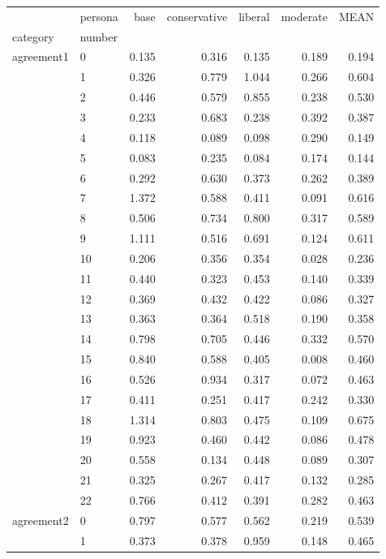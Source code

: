\begin{table}
\label{tab:questionnaire:sosec.var}
\begin{tabular}{llrrrrr}
\toprule
 & persona & base & conservative & liberal & moderate & MEAN \\
category & number &  &  &  &  &  \\
\midrule
\multirow[t]{23}{*}{agreement1} & 0 & 0.135 & 0.316 & 0.135 & 0.189 & 0.194 \\
 & 1 & 0.326 & 0.779 & 1.044 & 0.266 & 0.604 \\
 & 2 & 0.446 & 0.579 & 0.855 & 0.238 & 0.530 \\
 & 3 & 0.233 & 0.683 & 0.238 & 0.392 & 0.387 \\
 & 4 & 0.118 & 0.089 & 0.098 & 0.290 & 0.149 \\
 & 5 & 0.083 & 0.235 & 0.084 & 0.174 & 0.144 \\
 & 6 & 0.292 & 0.630 & 0.373 & 0.262 & 0.389 \\
 & 7 & 1.372 & 0.588 & 0.411 & 0.091 & 0.616 \\
 & 8 & 0.506 & 0.734 & 0.800 & 0.317 & 0.589 \\
 & 9 & 1.111 & 0.516 & 0.691 & 0.124 & 0.611 \\
 & 10 & 0.206 & 0.356 & 0.354 & 0.028 & 0.236 \\
 & 11 & 0.440 & 0.323 & 0.453 & 0.140 & 0.339 \\
 & 12 & 0.369 & 0.432 & 0.422 & 0.086 & 0.327 \\
 & 13 & 0.363 & 0.364 & 0.518 & 0.190 & 0.358 \\
 & 14 & 0.798 & 0.705 & 0.446 & 0.332 & 0.570 \\
 & 15 & 0.840 & 0.588 & 0.405 & 0.008 & 0.460 \\
 & 16 & 0.526 & 0.934 & 0.317 & 0.072 & 0.463 \\
 & 17 & 0.411 & 0.251 & 0.417 & 0.242 & 0.330 \\
 & 18 & 1.314 & 0.803 & 0.475 & 0.109 & 0.675 \\
 & 19 & 0.923 & 0.460 & 0.442 & 0.086 & 0.478 \\
 & 20 & 0.558 & 0.134 & 0.448 & 0.089 & 0.307 \\
 & 21 & 0.325 & 0.267 & 0.417 & 0.132 & 0.285 \\
 & 22 & 0.766 & 0.412 & 0.391 & 0.282 & 0.463 \\
\cline{1-7}
\multirow[t]{36}{*}{agreement2} & 0 & 0.797 & 0.577 & 0.562 & 0.219 & 0.539 \\
 & 1 & 0.373 & 0.378 & 0.959 & 0.148 & 0.465 \\

\end{tabular}
\end{table}

